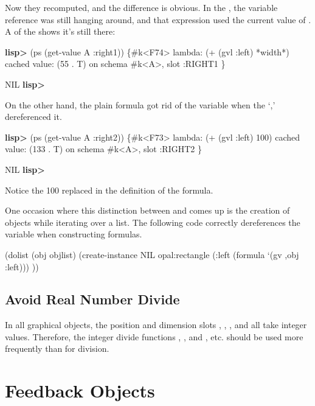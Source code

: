 Now they recomputed, and the difference is obvious.  In the ,
the  variable reference was still hanging around, and that
expression used the current value of .  A  of the
 shows it's still there:

\begin{programexample}
{\bf lisp>} (ps (get-value A :right1))
\{#k<F74>
  lambda:        (+ (gvl :left) *width*)
  cached value:  (55 . T)
  on schema #k<A>, slot :RIGHT1
  \}

NIL
{\bf lisp>}
\end{programexample}

On the other hand, the plain formula got rid of the  variable when
the `,' dereferenced it.

\begin{programexample}
{\bf lisp>} (ps (get-value A :right2))
\{#k<F73>
  lambda:        (+ (gvl :left) 100)
  cached value:  (133 . T)
  on schema #k<A>, slot :RIGHT2
  \}

NIL
{\bf lisp>}
\end{programexample}

Notice the 100 replaced  in the definition of the formula.

One occasion where this distinction between  and 
comes up is the creation of objects while iterating over a list.  The following
code correctly dereferences the variable  when constructing
formulas.

\begin{programexample}
(dolist (obj objlist)
  (create-instance NIL opal:rectangle
     (:left (formula `(gv ,obj :left)))
  ))
\end{programexample}




\subsection{Avoid Real Number Divide}

In all graphical objects, the position and dimension slots ,
, , and  all take integer values.
Therefore, the integer divide functions , , and
, etc. should be used more frequently than \pr{/} for
division.


\section{Feedback Objects}

